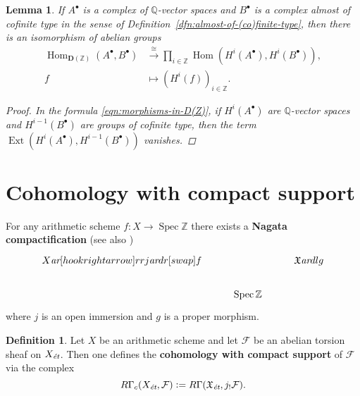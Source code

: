 \documentclass[leqno,12pt]{article}
\theoremstyle{plain}
\newtheorem{lemma}[theorem]{\indent\sc Lemma}
\theoremstyle{definition}
\newtheorem{definition}[theorem]{\indent\sc Definition}
\DeclareMathOperator{\Spec}{Spec}
\DeclareMathOperator{\Hom}{Hom}
\DeclareMathOperator{\Ext}{Ext}
\newcommand{\QQ}{\mathbb{Q}}
\newcommand{\ZZ}{\mathbb{Z}}
\newcommand{\dfn}{\mathrel{\mathop:}=}
\newcommand{\ar}{\text{\it ar}}
\newcommand{\et}{\text{\it \'{e}t}}
\newcommand{\DZ}{{\mathbf{D} (\ZZ)}}
\begin{document}
\begin{lemma}
  \label{lemma:morphisms-in-DAb-between-cplx-of-Q-vs-and-almost-cofinite-type-cplx}
  If $A^\bullet$ is a complex of $\QQ$-vector spaces and $B^\bullet$ is a
  complex almost of cofinite type in the sense of
  Definition~{\rm\ref{dfn:almost-of-(co)finite-type}}, then there is an
  isomorphism of abelian groups
  \begin{align*}
    \Hom_\DZ (A^\bullet, B^\bullet) & \xrightarrow{\cong}
    \prod_{i\in \ZZ} \Hom (H^i (A^\bullet), H^i (B^\bullet)),\\
    f & \mapsto (H^i (f))_{i\in \ZZ}.
  \end{align*}

  \begin{proof}
    In the formula \eqref{eqn:morphisms-in-D(Z)}, if $H^i (A^\bullet)$ are
    $\QQ$-vector spaces and $H^{i-1} (B^\bullet)$ are groups of cofinite type,
    then the term $\Ext (H^i (A^\bullet), H^{i-1} (B^\bullet))$ vanishes.
  \end{proof}
\end{lemma}


\section{Cohomology with compact support}
\label{app:modified-cohomology-with-compact-support}

For any arithmetic scheme $f\colon X\to \Spec \ZZ$ there exists a
\textbf{Nagata compactification}
\cite{Conrad-Deligne-Nagata,Conrad-Deligne-Nagata-erratum}
(see also \cite[Expos\'{e}~XVII]{SGA4})
\[ \begin{tikzcd}
X \ar[hookrightarrow]{rr}{j}\ar{dr}[swap]{f} & & \mathfrak{X} \ar{dl}{g} \\
 & \Spec \ZZ
\end{tikzcd} \]
where $j$ is an open immersion and $g$ is a proper morphism.

\begin{definition}
  Let $X$ be an arithmetic scheme and let $\mathcal{F}$ be an abelian torsion
  sheaf on $X_\et$. Then one defines the
  \textbf{cohomology with compact support} of $\mathcal{F}$ via the complex
  \begin{equation}
    \label{eqn:RGammac-via-extension-by-zero}
    R\Gamma_c (X_\et, \mathcal{F}) \dfn
    R\Gamma (\mathfrak{X}_\text{\it \'et}, j_! \mathcal{F}).
  \end{equation}
\end{definition}
\end{document}
